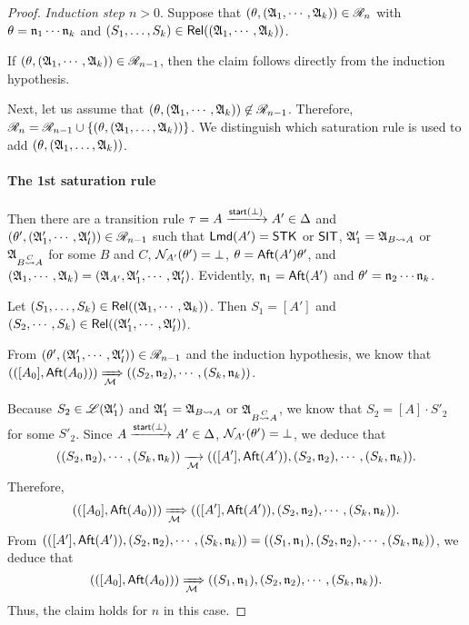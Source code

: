 \begin{proof}
\smallskip

\noindent \emph{Induction step $n > 0$}. 
Suppose that $(\theta, ({\mathfrak{A} }_1, \cdots, {\mathfrak{A} }_k)) \in \mathscr{R}_n$ with $\theta = \mathfrak{n}_1 \cdots \mathfrak{n}_k$ and $(S_1,\dots,S_k) \in \mathsf{Rel}(({\mathfrak{A} }_1, \cdots, {\mathfrak{A} }_k))$. 

If $(\theta, ({\mathfrak{A} }_1, \cdots, {\mathfrak{A} }_k)) \in \mathscr{R}_{n-1}$, then the claim follows directly from the induction hypothesis. 

Next, let us assume that $(\theta, ({\mathfrak{A} }_1, \cdots, {\mathfrak{A} }_k)) \not \in  \mathscr{R}_{n-1}$.
Therefore, $\mathscr{R}_{n} = \mathscr{R}_{n-1} \cup \{(\theta,({\mathfrak{A} }_1,\dots,{\mathfrak{A} }_k))\}$.  
%
We distinguish which saturation rule is used to add $(\theta,({\mathfrak{A} }_1,\dots,{\mathfrak{A} }_k))$.


\paragraph*{The 1st saturation rule} Then  there are a transition rule $\tau = A \xrightarrow{{\mathsf{start} }(\bot)} A'  \in \Delta$ and $(\theta', ({\mathfrak{A} }'_1, \cdots, {\mathfrak{A} }'_l)) \in \mathscr{R}_{n-1}$ such that ${\sf Lmd}(A')=\mathsf{STK}$ or ${\sf SIT}$, ${\mathfrak{A} }'_1 = {\mathfrak{A} }_{B \rightsquigarrow A}$ or ${\mathfrak{A} }_{B \stackrel{C}{\rightsquigarrow} A}$ for some $B$ and $C$,
$\mathcal{N}_{A'}(\theta') = \bot$, $\theta = {\sf Aft}(A') \theta'$, and $({\mathfrak{A} }_1, \cdots, {\mathfrak{A} }_k) = ({\mathfrak{A} }_{A'}, {\mathfrak{A} }'_1, \cdots, {\mathfrak{A} }'_l)$. 
Evidently, $\mathfrak{n}_1 = {\sf Aft}(A')$ and $\theta' = \mathfrak{n}_2 \cdots \mathfrak{n}_k$. 

Let $(S_1,\dots,S_k) \in \mathsf{Rel}(({\mathfrak{A} }_1, \cdots, {\mathfrak{A} }_k))$. Then $S_1 = [A']$ and $(S_2, \cdots, S_k) \in \mathsf{Rel}(({\mathfrak{A} }'_1, \cdots, {\mathfrak{A} }'_l))$. 

From $(\theta', ({\mathfrak{A} }'_1, \cdots, {\mathfrak{A} }'_l)) \in \mathscr{R}_{n-1}$ and the induction hypothesis, we know that $(([A_0], {\sf Aft}(A_0))) \xRightarrow[{\mathcal{M} }]{} ((S_2, \mathfrak{n}_2), \cdots, (S_k, \mathfrak{n}_k))$. 

Because $S_2 \in {\mathscr{L} }({\mathfrak{A} }'_1)$ and ${\mathfrak{A} }'_1 = {\mathfrak{A} }_{B \rightsquigarrow A}$ or ${\mathfrak{A} }_{B \stackrel{C}{\rightsquigarrow} A}$, we know that $S_2 = [A] \cdot S'_2$ for some $S'_2$.  
Since $A \xrightarrow{{\mathsf{start} }(\bot)}A'  \in \Delta$, $\mathcal{N}_{A'}(\theta') = \bot$, we deduce that 
$$((S_2, \mathfrak{n}_2), \cdots, (S_k, \mathfrak{n}_k)) \xrightarrow[{\mathcal{M} }]{} (([A'], {\sf Aft}(A')), (S_2, \mathfrak{n}_2), \cdots, (S_k, \mathfrak{n}_k)).$$
Therefore, 
$$(([A_0], {\sf Aft}(A_0))) \xRightarrow[{\mathcal{M} }]{} (([A'], {\sf Aft}(A')), (S_2, \mathfrak{n}_2), \cdots, (S_k, \mathfrak{n}_k)).$$ 
%
From $(([A'], {\sf Aft}(A')), (S_2, \mathfrak{n}_2), \cdots, (S_k, \mathfrak{n}_k)) = ((S_1, \mathfrak{n}_1), (S_2, \mathfrak{n}_2), \cdots, (S_k, \mathfrak{n}_k))$, we deduce that  
$$(([A_0], {\sf Aft}(A_0))) \xRightarrow[{\mathcal{M} }]{} ((S_1, \mathfrak{n}_1), (S_2, \mathfrak{n}_2), \cdots, (S_k, \mathfrak{n}_k)).$$ 
Thus, the claim holds for $n$ in this case. 


\end{proof}
